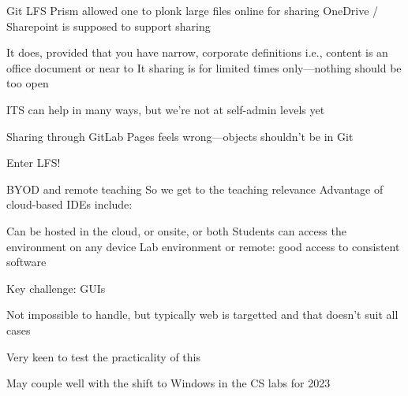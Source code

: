 \documentclass[aspectratio=169,t]{beamer}
\begin{document}
\begin{dframe}{Git LFS}
  \1 Prism allowed one to plonk large files online for sharing
  \1 OneDrive / Sharepoint is supposed to support sharing

  \2 It does, provided that you have narrow, corporate definitions
  \2 i.e., content is an office document or near to It
  \2 sharing is for limited times only---nothing should be too open

  \1 ITS can help in many ways, but we're not at self-admin levels yet

  \1 Sharing through GitLab Pages feels wrong---objects shouldn't be in Git
  
  \1 Enter LFS!

\end{dframe}

\begin{dframe}{BYOD and remote teaching}
  \1 So we get to the teaching relevance
  \1 Advantage of cloud-based IDEs include:
  
  \2 Can be hosted in the cloud, or onsite, or both
  \2 Students can access the environment on any device
  \2 Lab environment or remote: good access to consistent software

  \1 Key challenge: GUIs
  
  \2 Not impossible to handle, but typically web is targetted
  \2 and that doesn't suit all cases

  \1 Very keen to test the practicality of this
  
  \2 May couple well with the shift to Windows in the CS labs for 2023
\end{dframe}

\begin{comment}
\begin{dframe}{FaaS, serverless and responsiveness}
  \1 Edge appearance
\end{dframe}
\end{comment}
\end{document}
